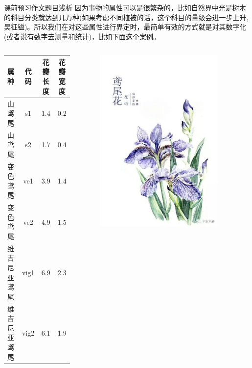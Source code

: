 \documentclass[handout]{ctexbeamer}
\begin{document}
\begin{frame}{课前预习作文题目浅析}
	因为事物的属性可以是很繁杂的，比如自然界中光是树木的科目分类就达到几万种(如果考虑不同植被的话，这个科目的量级会进一步上升, 吴征镒)。所以我们在对这些属性进行界定时，最简单有效的方式就是对其数字化(或者说有数字去测量和统计)，比如下面这个案例。
	
	\begin{columns}
	\begin{column}{0.7\textwidth}
		\begin{table}[H]
		\centering
		\begin{tabular}{lccc}
		\hline 
			属种 & 代码 &花瓣长度 & 花瓣宽度 \\
			\hline 
			山鸢尾 & s1 & 1.4 & 0.2 \\
			山鸢尾 & s2 & 1.7 & 0.4 \\
			变色鸢尾 & ve1 & 3.9  & 1.4 \\
			变色鸢尾 & ve2& 4.9 & 1.5 \\
			维吉尼亚鸢尾 & vig1 & 6.9 & 2.3  \\
			维吉尼亚鸢尾 & vig2 & 6.1 & 1.9 \\
			\hline  
		\end{tabular}
\end{table}
	\end{column}
	\begin{column}{0.3\textwidth}
	\begin{figure}[H]
		\centering
		\includegraphics[width=0.9\textwidth]{fig/iris}
	\end{figure}	
	\end{column}
\end{columns}
\end{frame}
\end{document}
